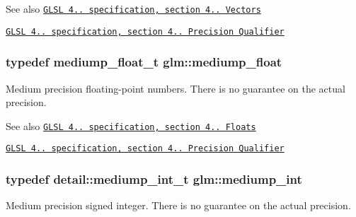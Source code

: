 \begin{DoxySeeAlso}{\-See also}
\href{http://www.opengl.org/registry/doc/GLSLangSpec.4.20.8.pdf}{\tt \-G\-L\-S\-L 4.. specification, section 4.. \-Vectors} 

\href{http://www.opengl.org/registry/doc/GLSLangSpec.4.20.8.pdf}{\tt \-G\-L\-S\-L 4.. specification, section 4.. \-Precision \-Qualifier} 
\end{DoxySeeAlso}
\hypertarget{group__core__precision_gac785826c039fe6c97c03b37c81c1a68e}{
\subsubsection[{mediump\-\_\-float}]{\setlength{\rightskip}{0pt plus 5cm}typedef mediump\-\_\-float\-\_\-t {\bf glm\-::mediump\-\_\-float}}}\label{group__core__precision_gac785826c039fe6c97c03b37c81c1a68e}
\-Medium precision floating-\/point numbers. \-There is no guarantee on the actual precision.

\begin{DoxySeeAlso}{\-See also}
\href{http://www.opengl.org/registry/doc/GLSLangSpec.4.20.8.pdf}{\tt \-G\-L\-S\-L 4.. specification, section 4.. \-Floats} 

\href{http://www.opengl.org/registry/doc/GLSLangSpec.4.20.8.pdf}{\tt \-G\-L\-S\-L 4.. specification, section 4.. \-Precision \-Qualifier} 
\end{DoxySeeAlso}
\hypertarget{group__core__precision_ga2a3dcbcd7f4e17663d393a12061ac6ac}{
\subsubsection[{mediump\-\_\-int}]{\setlength{\rightskip}{0pt plus 5cm}typedef detail\-::mediump\-\_\-int\-\_\-t {\bf glm\-::mediump\-\_\-int}}}\label{group__core__precision_ga2a3dcbcd7f4e17663d393a12061ac6ac}
\-Medium precision signed integer. \-There is no guarantee on the actual precision.

